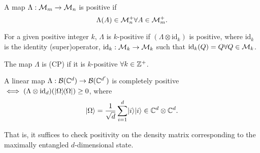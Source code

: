 \begin{defn}
    A map $\Lambda:\mathcal{M}_m\to \mathcal{M}_n$ is positive if
    \begin{equation}
        \Lambda(A)\in \mathcal{M}_n^+ \forall A \in \mathcal{M}_m^+.
    \end{equation}
\end{defn}
\begin{defn}
    For a given positive integer $k$, $\Lambda$ is $k$-positive if
    $(\Lambda \otimes \text{id}_k)$ is positive, where $\text{id}_k$ is the identity (super)operator, $\text{id}_k:\mathcal{M}_k \to \mathcal{M}_k$ such that $\text{id}_k(Q)=Q \forall Q\in \mathcal{M}_k$.
\end{defn}
\begin{defn}
    The map $\Lambda$ is  (CP) if it is $k$-positive $\forall k\in \mathbb{Z}^+$.
\end{defn}
\begin{thm}
    A linear map $\Lambda:\mathcal{B}(\mathbb{C}^d)\to \mathcal{B}(\mathbb{C}^{d'})$ is completely positive $\iff (\Lambda \otimes \operatorname{id}_d)(\left\lvert \Omega \middle\rangle\!\middle\langle \Omega \right\rvert)\geq 0$, where
    \begin{equation}
        \lvert\Omega\rangle=\frac{1}{\sqrt{d}}\sum_{i=1}^d \lvert i\rangle\lvert i\rangle \in \mathbb{C}^d \otimes \mathbb{C}^d.
    \end{equation}
\end{thm}
That is, it suffices to check positivity on the density matrix corresponding to the maximally entangled $d$-dimensional state.
